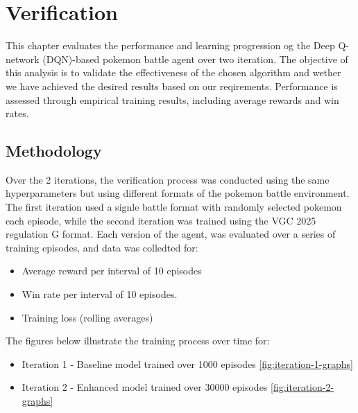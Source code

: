 \section{Verification}
\label{sec:verification}

This chapter evaluates the performance and learning progression og the Deep Q-network 
(DQN)-based pokemon battle agent over two iteration. The objective of this analysis 
is to validate the effectiveness of the chosen algorithm and wether we have achieved
the desired results based on our reqirements. Performance is assessed through empirical
training results, including average rewards and win rates.  

\subsection{Methodology}
Over the 2 iterations, the verification process was conducted using the same hyperparameters
but using different formats of the pokemon battle environment.
The first iteration used a signle battle format with randomly selected pokemon each
episode, while the second iteration was trained using the VGC 2025 regulation G format.
Each version of the agent, was evaluated over a series of training episodes, and data 
was colledted for:
\begin{itemize}
    \item Average reward per interval of 10 episodes
    \item Win rate per interval of 10 episodes.
    \item Training loss (rolling averages)
\end{itemize}
The figures below illustrate the training process over time for:
\begin{itemize}
    \item Iteration 1 - Baseline model trained over 1000 episodes \ref{fig:iteration-1-graphs}
    \item Iteration 2 - Enhanced model trained over 30000 episodes \ref{fig:iteration-2-graphs} 
\end{itemize}


